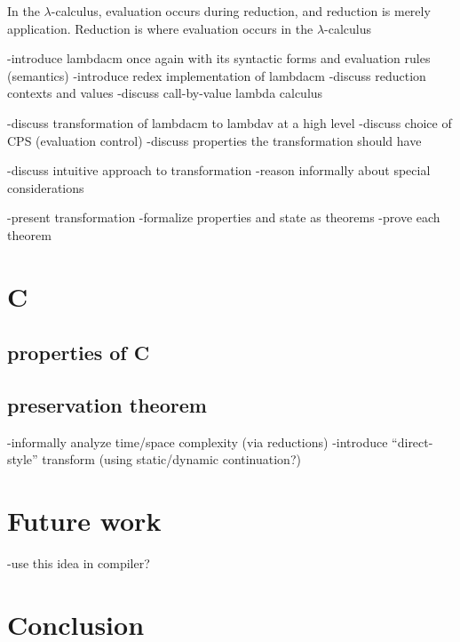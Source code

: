 \documentclass[ms,electronic,twosidetoc,letterpaper,chaptercenter,parttop]{byumsphd}
\begin{document}
In the $\lambda$-calculus, evaluation occurs during reduction, and reduction is merely application. Reduction is where evaluation occurs in the $\lambda$-calculus

-introduce lambdacm once again with its syntactic forms and evaluation rules (semantics)
-introduce redex implementation of lambdacm
 -discuss reduction contexts and values
 -discuss call-by-value lambda calculus

-discuss transformation of lambdacm to lambdav at a high level
 -discuss choice of CPS (evaluation control)
-discuss properties the transformation should have

-discuss intuitive approach to transformation
-reason informally about special considerations

-present transformation
-formalize properties and state as theorems
-prove each theorem

\section{C}
\subsection{properties of C}
\subsection{preservation theorem}
-informally analyze time/space complexity (via reductions)
-introduce ``direct-style'' transform (using static/dynamic continuation?)
\section{Future work}
-use this idea in compiler?
\section{Conclusion}


\end{document}

